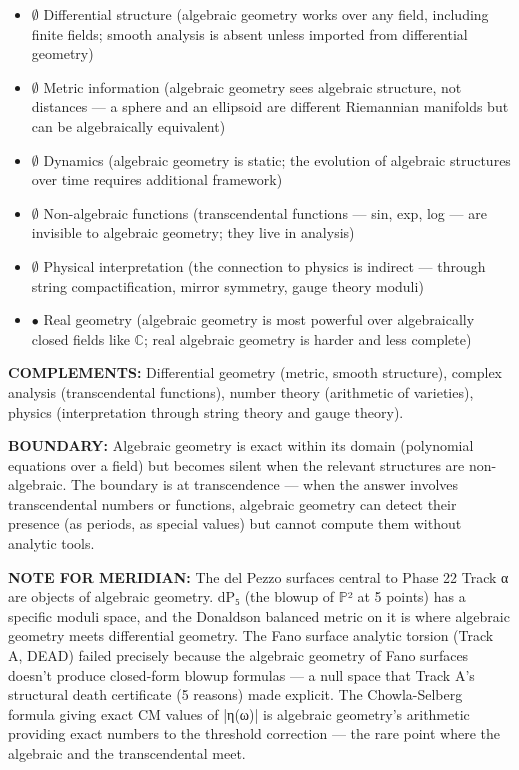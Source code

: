 \begin{itemize}[nosep,leftmargin=*]
  \item $\emptyset$ Differential structure (algebraic geometry works over any field, including finite fields; smooth analysis is absent unless imported from differential geometry)
  \item $\emptyset$ Metric information (algebraic geometry sees algebraic structure, not distances — a sphere and an ellipsoid are different Riemannian manifolds but can be algebraically equivalent)
  \item $\emptyset$ Dynamics (algebraic geometry is static; the evolution of algebraic structures over time requires additional framework)
  \item $\emptyset$ Non-algebraic functions (transcendental functions — sin, exp, log — are invisible to algebraic geometry; they live in analysis)
  \item $\emptyset$ Physical interpretation (the connection to physics is indirect — through string compactification, mirror symmetry, gauge theory moduli)
  \item $\bullet$ Real geometry (algebraic geometry is most powerful over algebraically closed fields like $\mathbb{C}$; real algebraic geometry is harder and less complete)
\end{itemize}


\textbf{COMPLEMENTS:} Differential geometry (metric, smooth structure), complex analysis (transcendental functions), number theory (arithmetic of varieties), physics (interpretation through string theory and gauge theory).


\textbf{BOUNDARY:} Algebraic geometry is exact within its domain (polynomial equations over a field) but becomes silent when the relevant structures are non-algebraic. The boundary is at transcendence — when the answer involves transcendental numbers or functions, algebraic geometry can detect their presence (as periods, as special values) but cannot compute them without analytic tools.


\textbf{NOTE FOR MERIDIAN:} The del Pezzo surfaces central to Phase 22 Track α are objects of algebraic geometry. dP₅ (the blowup of $\mathbb{P}$² at 5 points) has a specific moduli space, and the Donaldson balanced metric on it is where algebraic geometry meets differential geometry. The Fano surface analytic torsion (Track A, DEAD) failed precisely because the algebraic geometry of Fano surfaces doesn't produce closed-form blowup formulas — a null space that Track A's structural death certificate (5 reasons) made explicit. The Chowla-Selberg formula giving exact CM values of |η(ω)| is algebraic geometry's arithmetic providing exact numbers to the threshold correction — the rare point where the algebraic and the transcendental meet.


